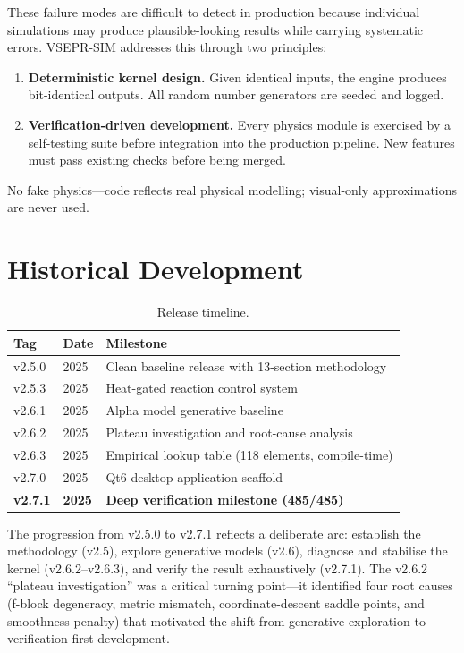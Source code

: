 \documentclass[11pt,twoside]{article}
\begin{document}
These failure modes are difficult to detect in production because individual
simulations may produce plausible-looking results while carrying systematic
errors.  VSEPR-SIM addresses this through two principles:

\begin{enumerate}
  \item \textbf{Deterministic kernel design.}  Given identical inputs, the
        engine produces bit-identical outputs.  All random number generators
        are seeded and logged.
  \item \textbf{Verification-driven development.}  Every physics module is
        exercised by a self-testing suite before integration into the
        production pipeline.  New features must pass existing checks before
        being merged.
\end{enumerate}

No fake physics---code reflects real physical modelling; visual-only
approximations are never used.


\section{Historical Development}
\label{sec:history}

\begin{table}[H]
\centering
\caption{Release timeline.}
\label{tab:versions}
\begin{tabular}{lll}
\toprule
\textbf{Tag} & \textbf{Date} & \textbf{Milestone} \\
\midrule
v2.5.0 & 2025 & Clean baseline release with 13-section methodology \\
v2.5.3 & 2025 & Heat-gated reaction control system \\
v2.6.1 & 2025 & Alpha model generative baseline \\
v2.6.2 & 2025 & Plateau investigation and root-cause analysis \\
v2.6.3 & 2025 & Empirical lookup table (118 elements, compile-time) \\
v2.7.0 & 2025 & Qt6 desktop application scaffold \\
\textbf{v2.7.1} & \textbf{2025} & \textbf{Deep verification milestone (485/485)} \\
\bottomrule
\end{tabular}
\end{table}

The progression from v2.5.0 to v2.7.1 reflects a deliberate arc: establish
the methodology (v2.5), explore generative models (v2.6), diagnose and
stabilise the kernel (v2.6.2--v2.6.3), and verify the result exhaustively
(v2.7.1).  The v2.6.2 ``plateau investigation'' was a critical turning
point---it identified four root causes (f-block degeneracy, metric mismatch,
coordinate-descent saddle points, and smoothness penalty) that motivated the
shift from generative exploration to verification-first development.
\end{document}
